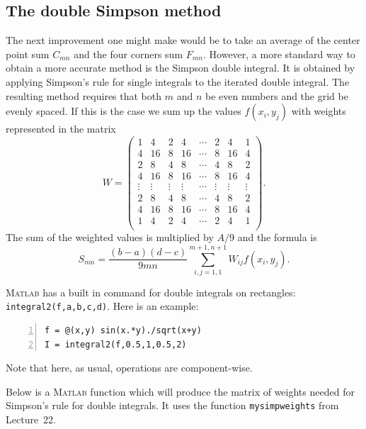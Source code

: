 
\subsection*{The double Simpson method}

The next improvement one might make would be to take an average of
the center point sum $C_{mn}$ and the four corners sum $F_{mn}$.
However, a more standard way to obtain a more accurate method
is the Simpson double integral. It is obtained by applying Simpson's
rule for single integrals to the iterated double integral.
The resulting method requires that both $m$ and $n$ be even numbers
and the grid be evenly spaced. If this is the case we sum up the
values $f(x_i,y_j)$ with weights represented in the matrix
\begin{equation}\label{dblsimpmatrix}
W = \left( \begin{array}{cccccccc}
           1 & 4 & 2 & 4 & \cdots & 2 & 4 & 1 \\
           4 & 16 & 8 & 16 & \cdots & 8 & 16 & 4 \\
           2 & 8 & 4 & 8 & \cdots & 4 & 8 & 2 \\
           4 & 16 & 8 & 16 & \cdots & 8 & 16 & 4 \\
        \vdots & \vdots & \vdots & \vdots & \cdots & \vdots & \vdots & \vdots \\
           2 & 8 & 4 & 8 & \cdots & 4 & 8 & 2 \\
           4 & 16 & 8 & 16 & \cdots & 8 & 16 & 4 \\
           1 & 4 & 2 & 4 & \cdots & 2 & 4 & 1 \\
           \end{array}
    \right).
\end{equation}
The sum of the weighted values is multiplied by $A/9$ and the formula is
$$
     S_{mn} = \frac{(b-a)(d-c)}{9mn} \sum_{i,j = 1,1}^{m+1,n+1}
                       W_{ij} f(x_i,y_j).
$$


\textsc{Matlab} has a built in command for double integrals on
rectangles: \verb&integral2(f,a,b,c,d)&. Here is an example:
\begin{lstlisting}[frame=none,numbers=left]
f = @(x,y) sin(x.*y)./sqrt(x+y)
I = integral2(f,0.5,1,0.5,2)
\end{lstlisting}
Note that here, as usual, operations are component-wise.

Below is a \textsc{Matlab} function which will produce the
matrix of weights needed for Simpson's rule for double integrals.
It uses the function \verb&mysimpweights& from Lecture~22.



